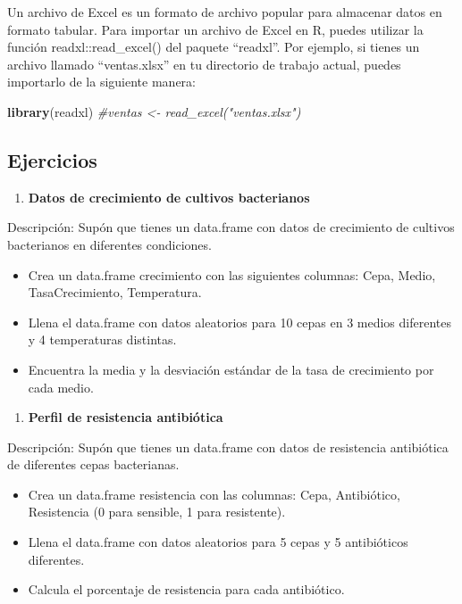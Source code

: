 \documentclass[
]{book}
\newenvironment{Shaded}{\begin{snugshade}}{\end{snugshade}}
\newcommand{\CommentTok}[1]{\textcolor[rgb]{0.56,0.35,0.01}{\textit{#1}}}
\newcommand{\FunctionTok}[1]{\textcolor[rgb]{0.13,0.29,0.53}{\textbf{#1}}}
\newcommand{\NormalTok}[1]{#1}
\providecommand{\tightlist}{%
  \setlength{\itemsep}{0pt}\setlength{\parskip}{0pt}}
\begin{document}
Un archivo de Excel es un formato de archivo popular para almacenar datos en formato tabular. Para importar un archivo de Excel en R, puedes utilizar la función readxl::read\_excel() del paquete ``readxl''. Por ejemplo, si tienes un archivo llamado ``ventas.xlsx'' en tu directorio de trabajo actual, puedes importarlo de la siguiente manera:

\begin{Shaded}
\begin{Highlighting}[]
\FunctionTok{library}\NormalTok{(readxl)}
\CommentTok{\#ventas \textless{}{-} read\_excel("ventas.xlsx")}
\end{Highlighting}
\end{Shaded}

\subsection{Ejercicios}\label{ejercicios-1}

\begin{enumerate}
\def\labelenumi{\arabic{enumi}.}
\tightlist
\item
  \textbf{Datos de crecimiento de cultivos bacterianos}
\end{enumerate}

Descripción: Supón que tienes un data.frame con datos de crecimiento de cultivos bacterianos en diferentes condiciones.

\begin{itemize}
\tightlist
\item
  Crea un data.frame crecimiento con las siguientes columnas: Cepa, Medio, TasaCrecimiento, Temperatura.
\item
  Llena el data.frame con datos aleatorios para 10 cepas en 3 medios diferentes y 4 temperaturas distintas.
\item
  Encuentra la media y la desviación estándar de la tasa de crecimiento por cada medio.
\end{itemize}

\begin{enumerate}
\def\labelenumi{\arabic{enumi}.}
\setcounter{enumi}{1}
\tightlist
\item
  \textbf{Perfil de resistencia antibiótica}
\end{enumerate}

Descripción: Supón que tienes un data.frame con datos de resistencia antibiótica de diferentes cepas bacterianas.

\begin{itemize}
\tightlist
\item
  Crea un data.frame resistencia con las columnas: Cepa, Antibiótico, Resistencia (0 para sensible, 1 para resistente).
\item
  Llena el data.frame con datos aleatorios para 5 cepas y 5 antibióticos diferentes.
\item
  Calcula el porcentaje de resistencia para cada antibiótico.
\end{itemize}
\end{document}
